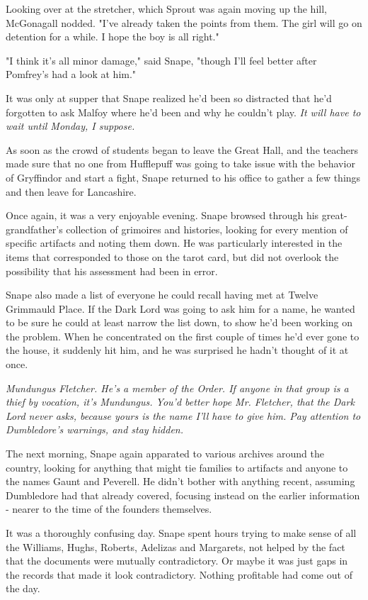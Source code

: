 \documentclass[a4paper,11pt]{article}
\begin{document}
Looking over at the stretcher, which Sprout was again moving up the hill, McGonagall nodded. "I've already taken the points from them. The girl will go on detention for a while. I hope the boy is all right."

"I think it's all minor damage," said Snape, "though I'll feel better after Pomfrey's had a look at him."

It was only at supper that Snape realized he'd been so distracted that he'd forgotten to ask Malfoy where he'd been and why he couldn't play. \emph{It will have to wait until Monday, I suppose.}

As soon as the crowd of students began to leave the Great Hall, and the teachers made sure that no one from Hufflepuff was going to take issue with the behavior of Gryffindor and start a fight, Snape returned to his office to gather a few things and then leave for Lancashire.

Once again, it was a very enjoyable evening. Snape browsed through his great-grandfather's collection of grimoires and histories, looking for every mention of specific artifacts and noting them down. He was particularly interested in the items that corresponded to those on the tarot card, but did not overlook the possibility that his assessment had been in error.

Snape also made a list of everyone he could recall having met at Twelve Grimmauld Place. If the Dark Lord was going to ask him for a name, he wanted to be sure he could at least narrow the list down, to show he'd been working on the problem. When he concentrated on the first couple of times he'd ever gone to the house, it suddenly hit him, and he was surprised he hadn't thought of it at once.

\emph{Mundungus Fletcher. He's a member of the Order. If anyone in that group is a thief by vocation, it's Mundungus. You'd better hope Mr. Fletcher, that the Dark Lord never asks, because yours is the name I'll have to give him. Pay attention to Dumbledore's warnings, and stay hidden.}

The next morning, Snape again apparated to various archives around the country, looking for anything that might tie families to artifacts and anyone to the names Gaunt and Peverell. He didn't bother with anything recent, assuming Dumbledore had that already covered, focusing instead on the earlier information - nearer to the time of the founders themselves.

It was a thoroughly confusing day. Snape spent hours trying to make sense of all the Williams, Hughs, Roberts, Adelizas and Margarets, not helped by the fact that the documents were mutually contradictory. Or maybe it was just gaps in the records that made it look contradictory. Nothing profitable had come out of the day.
\end{document}

